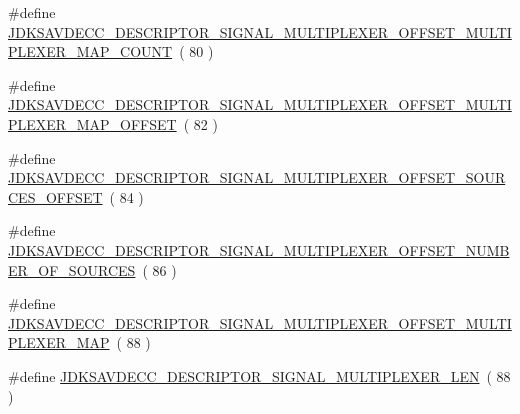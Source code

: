 \begin{DoxyCompactItemize}
\item 
\#define \hyperlink{group__descriptor__signal__multiplexer_ga37ada7f14557b951dbd715b20e873a9f}{J\+D\+K\+S\+A\+V\+D\+E\+C\+C\+\_\+\+D\+E\+S\+C\+R\+I\+P\+T\+O\+R\+\_\+\+S\+I\+G\+N\+A\+L\+\_\+\+M\+U\+L\+T\+I\+P\+L\+E\+X\+E\+R\+\_\+\+O\+F\+F\+S\+E\+T\+\_\+\+M\+U\+L\+T\+I\+P\+L\+E\+X\+E\+R\+\_\+\+M\+A\+P\+\_\+\+C\+O\+U\+NT}~( 80 )
\item 
\#define \hyperlink{group__descriptor__signal__multiplexer_ga8ed85fbdc538540f178c3d1a2e02cfdb}{J\+D\+K\+S\+A\+V\+D\+E\+C\+C\+\_\+\+D\+E\+S\+C\+R\+I\+P\+T\+O\+R\+\_\+\+S\+I\+G\+N\+A\+L\+\_\+\+M\+U\+L\+T\+I\+P\+L\+E\+X\+E\+R\+\_\+\+O\+F\+F\+S\+E\+T\+\_\+\+M\+U\+L\+T\+I\+P\+L\+E\+X\+E\+R\+\_\+\+M\+A\+P\+\_\+\+O\+F\+F\+S\+ET}~( 82 )
\item 
\#define \hyperlink{group__descriptor__signal__multiplexer_gae4aff1e70eabe38e0054d0bab409077f}{J\+D\+K\+S\+A\+V\+D\+E\+C\+C\+\_\+\+D\+E\+S\+C\+R\+I\+P\+T\+O\+R\+\_\+\+S\+I\+G\+N\+A\+L\+\_\+\+M\+U\+L\+T\+I\+P\+L\+E\+X\+E\+R\+\_\+\+O\+F\+F\+S\+E\+T\+\_\+\+S\+O\+U\+R\+C\+E\+S\+\_\+\+O\+F\+F\+S\+ET}~( 84 )
\item 
\#define \hyperlink{group__descriptor__signal__multiplexer_ga547f6710c1c60634386fa36e3adaba6d}{J\+D\+K\+S\+A\+V\+D\+E\+C\+C\+\_\+\+D\+E\+S\+C\+R\+I\+P\+T\+O\+R\+\_\+\+S\+I\+G\+N\+A\+L\+\_\+\+M\+U\+L\+T\+I\+P\+L\+E\+X\+E\+R\+\_\+\+O\+F\+F\+S\+E\+T\+\_\+\+N\+U\+M\+B\+E\+R\+\_\+\+O\+F\+\_\+\+S\+O\+U\+R\+C\+ES}~( 86 )
\item 
\#define \hyperlink{group__descriptor__signal__multiplexer_ga7103b948523919d1cb5ca75b7fcfed04}{J\+D\+K\+S\+A\+V\+D\+E\+C\+C\+\_\+\+D\+E\+S\+C\+R\+I\+P\+T\+O\+R\+\_\+\+S\+I\+G\+N\+A\+L\+\_\+\+M\+U\+L\+T\+I\+P\+L\+E\+X\+E\+R\+\_\+\+O\+F\+F\+S\+E\+T\+\_\+\+M\+U\+L\+T\+I\+P\+L\+E\+X\+E\+R\+\_\+\+M\+AP}~( 88 )
\item 
\#define \hyperlink{group__descriptor__signal__multiplexer_ga300d29c873c2da91e9cbdf1a73dd62f1}{J\+D\+K\+S\+A\+V\+D\+E\+C\+C\+\_\+\+D\+E\+S\+C\+R\+I\+P\+T\+O\+R\+\_\+\+S\+I\+G\+N\+A\+L\+\_\+\+M\+U\+L\+T\+I\+P\+L\+E\+X\+E\+R\+\_\+\+L\+EN}~( 88 )
\end{DoxyCompactItemize}
